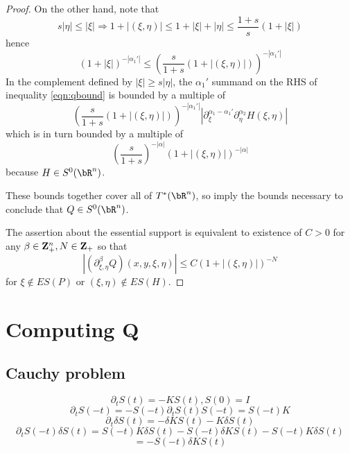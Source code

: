 \begin{proof}
  On the other hand, note that
  \[
    s|\eta| \le |\xi| \Rightarrow 1 + |(\xi,\eta)| \le 1 + |\xi| + |\eta| 
    \le \frac{1+s}{s} (1+ |\xi|) 
  \]
  hence
  \[
    (1 + |\xi|)^{-|\alpha_1'|} \le \left(\frac{s}{1+s}(1+|(\xi,\eta)|)\right)^{-|\alpha_1'|}   
  \]
  In the complement defined by $|\xi|\ge s|\eta|$, the $\alpha_1'$  summand on the RHS of inequality \ref{eqn:qbound} is bounded by a multiple of
  \[
    \left(\frac{s}{1+s}(1 + |(\xi,\eta)|)\right)^{-|\alpha_1'|}|\partial_{\xi}^{\alpha_1-\alpha_1'}\partial_{\eta}^{\alpha_2}H(\xi,\eta) |
  \]
  which is in turn bounded by a multiple of
  \[
    \left(\frac{s}{1+s}\right)^{-|\alpha|} (1+|(\xi,\eta)|)^{-|\alpha|}
  \]
  because $H \in S^0(\bR^n)$.

  These bounds together cover all of $T^*(\bR^n)$, so imply the bounds necessary to conclude that $Q \in S^0(\bR^n)$.
    
  The assertion about the essential support is equivalent to existence of $C>0$ for any $\beta \in {\bf Z}_+^n, N \in {\bf Z}_+$ so that
  \[
    |(\partial_{\xi,\eta}^{\beta} Q)(x,y,\xi, \eta)| \le C(1+|(\xi,\eta)|)^{-N}
  \]
  for $\xi \notin ES(P)$ or $(\xi,\eta) \notin ES(H)$.
\end{proof}

\section{Computing Q}

\subsection{Cauchy problem}
\[
  \partial_t S(t) = -K S(t), S(0)=I
\]
\[
  \partial_t S(-t) = -S(-t) \partial_t S(t) S(-t) = S(-t)K
\]
\[
  \partial_t \delta S(t) = - \delta K S(t) - K \delta S(t)
\]
\[
  \partial_t S(-t)\delta S(t) = S(-t)K\delta S(t) - S(-t) \delta K S(t) - S(-t)K \delta S(t)
\]
\begin{equation}
  \label{eqn:qevol1}
  =  -S(-t)\delta K S(t)
\end{equation}

